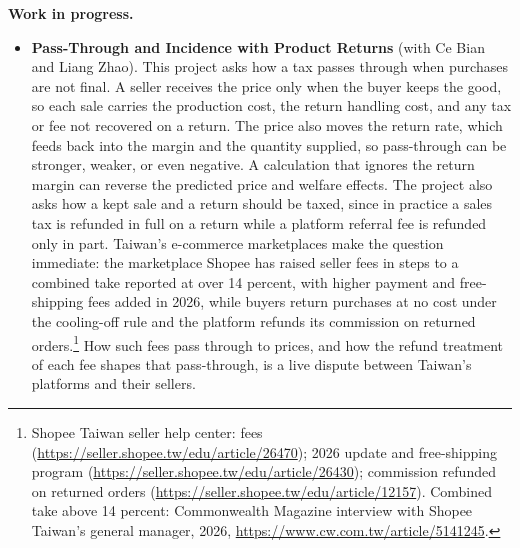 \documentclass[11pt,letterpaper]{article}
\begin{document}
\medskip
\noindent\textbf{Work in progress.}
\begin{itemize}[leftmargin=1.6em,itemsep=0.2em,topsep=0.1em,parsep=0.1em]
\item \textbf{Pass-Through and Incidence with Product Returns} (with Ce Bian and Liang Zhao). This project asks how a tax passes through when purchases are not final. A seller receives the price only when the buyer keeps the good, so each sale carries the production cost, the return handling cost, and any tax or fee not recovered on a return. The price also moves the return rate, which feeds back into the margin and the quantity supplied, so pass-through can be stronger, weaker, or even negative. A calculation that ignores the return margin can reverse the predicted price and welfare effects. The project also asks how a kept sale and a return should be taxed, since in practice a sales tax is refunded in full on a return while a platform referral fee is refunded only in part. Taiwan's e-commerce marketplaces make the question immediate: the marketplace Shopee has raised seller fees in steps to a combined take reported at over 14 percent, with higher payment and free-shipping fees added in 2026, while buyers return purchases at no cost under the cooling-off rule and the platform refunds its commission on returned orders.\footnote{Shopee Taiwan seller help center: fees (\url{https://seller.shopee.tw/edu/article/26470}); 2026 update and free-shipping program (\url{https://seller.shopee.tw/edu/article/26430}); commission refunded on returned orders (\url{https://seller.shopee.tw/edu/article/12157}). Combined take above 14 percent: Commonwealth Magazine interview with Shopee Taiwan's general manager, 2026, \url{https://www.cw.com.tw/article/5141245}.} How such fees pass through to prices, and how the refund treatment of each fee shapes that pass-through, is a live dispute between Taiwan's platforms and their sellers.

\end{itemize}
\end{document}
